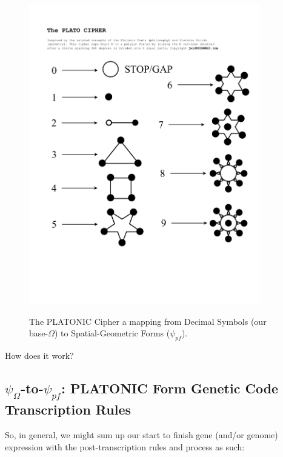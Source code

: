 \documentclass[a4paper, 18pt]{book} %
\begin{document}
\begin{figure}[H]
  \begin{center}
   \includegraphics[trim=0cm 4cm 0cm 0cm, clip, width=0.9\textwidth,]{resources/pdfs/PLATOCIPHER.pdf}\\
   \caption{The PLATONIC Cipher\cite{lutalo_2025_platonic} a mapping from Decimal Symbols (our base-$\Omega$) to Spatial-Geometric Forms ($\psi_{pf}$).}
  \label{FIGPLATONICCIPH}
  \end{center}
\end{figure}


How does it work?

\subsection{$\psi_{\Omega}$-to-$\psi_{pf}$: PLATONIC Form Genetic Code Transcription Rules}
\label{SECGENSEQEXPRES}


So, in general, we might sum up our start to finish gene (and/or genome) expression with the post-transcription rules and process as such:
\end{document}
